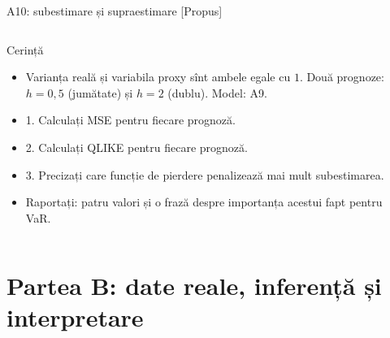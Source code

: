 \begin{frame}{A10: subestimare și supraestimare [Propus]}
\propsub
\itemsize{\scriptsize}
\begin{columns}[T]
\begin{column}{\taskw}
\begin{block}{Cerință}
\begin{itemize}
    \item Varianța reală și variabila proxy sînt ambele egale cu $1$. Două prognoze: $h = 0{,}5$ (jumătate) și $h = 2$ (dublu). Model: A9.
    \item 1. Calculați MSE pentru fiecare prognoză.
    \item 2. Calculați QLIKE pentru fiecare prognoză.
    \item 3. Precizați care funcție de pierdere penalizează mai mult subestimarea.
    \item Raportați: patru valori și o frază despre importanța acestui fapt pentru VaR.
\end{itemize}
\end{block}
\end{column}
\begin{column}{\solw}
\end{column}
\end{columns}
\end{frame}


\section{Partea B: date reale, inferență și interpretare}

